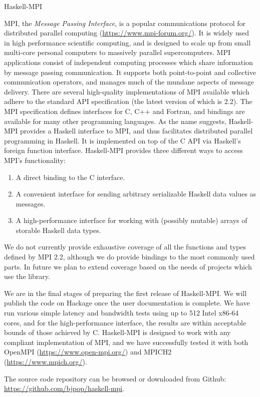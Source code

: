 \documentclass{scrreprt}
\begin{document}
\begin{hcarentry}{Haskell-MPI}
\makeheader

MPI, the \emph{Message Passing Interface}, is a popular communications protocol
for distributed parallel computing (\url{https://www.mpi-forum.org/}). It is widely
used in high performance scientific computing, and is designed to scale up from
small multi-core personal computers to massively parallel supercomputers.
MPI applications
consist of independent computing processes which share information by message passing
communication. It supports both point-to-point and collective communication operators,
and manages much of the mundane aspects of message delivery. There are several
high-quality implementations of MPI available which adhere to the standard API
specification (the latest version of which is 2.2). The MPI specification defines
interfaces for C, C++ and Fortran, and bindings are available for many other
programming languages. As the name suggests, Haskell-MPI provides a Haskell interface
to MPI, and thus facilitates distributed parallel programming in Haskell. It is implemented
on top of the C API via Haskell's foreign function interface. Haskell-MPI provides
three different ways to access MPI's functionality:
\begin{enumerate}
   \item A direct binding to the C interface.
   \item A convenient interface for sending arbitrary serializable Haskell data values as messages.
   \item A high-performance interface for working with (possibly mutable) arrays of storable
         Haskell data types.
\end{enumerate}
We do not currently provide exhaustive coverage of all the functions and types defined by MPI
2.2, although we do provide bindings to the most commonly used parts. In future we plan
to extend coverage based on the needs of projects which use the library.

We are in the final stages of preparing the first release of Haskell-MPI. We will
publish the code on Hackage once the user documentation is complete.
We have run various simple latency and bandwidth tests using up to 512 Intel x86-64 cores, and
for the high-performance interface, the results are within acceptable bounds of those
achieved by C.
Haskell-MPI is designed to work with any compliant implementation of MPI, and we
have successfully tested it with both OpenMPI (\url{https://www.open-mpi.org/}) and
MPICH2 (\url{https://www.mpich.org/}).

The source code repository can be browsed or downloaded from Github:
  \url{https://github.com/bjpop/haskell-mpi}.

\end{hcarentry}
\end{document}
